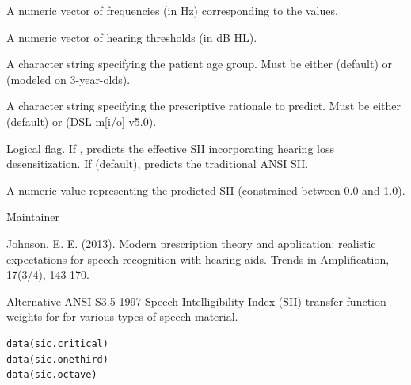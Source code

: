 \documentclass[letterpaper]{book}
\begin{document}
\begin{Arguments}
\begin{ldescription}
\item[\code{freq}] A numeric vector of frequencies (in Hz) corresponding to the  values.
\item[\code{threshold}] A numeric vector of hearing thresholds (in dB HL).
\item[\code{age}] A character string specifying the patient age group. Must be either  (default) or  (modeled on 3-year-olds).
\item[\code{prescription}] A character string specifying the prescriptive rationale to predict. Must be either  (default) or  (DSL m[i/o] v5.0).
\item[\code{desensitized}] Logical flag. If , predicts the effective SII incorporating hearing loss desensitization. If  (default), predicts the traditional ANSI SII.
\end{ldescription}
\end{Arguments}
%
\begin{Value}
A numeric value representing the predicted SII (constrained between 0.0 and 1.0).
\end{Value}
%
\begin{Author}
Maintainer
\end{Author}
%
\begin{References}
Johnson, E. E. (2013). Modern prescription theory and application: realistic expectations for speech recognition with hearing aids. Trends in Amplification, 17(3/4), 143-170.
\end{References}
%
\begin{Description}
Alternative ANSI S3.5-1997 Speech Intelligibility Index (SII) transfer
function weights for for various types of speech material.
\end{Description}
%
\begin{Usage}
\begin{verbatim}
data(sic.critical)
data(sic.onethird)
data(sic.octave)
\end{verbatim}
\end{Usage}
%
\end{document}
